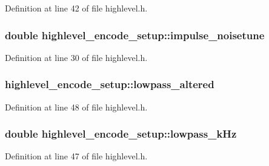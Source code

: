 Definition at line 42 of file highlevel.\+h.

\subsubsection[{\texorpdfstring{impulse\+\_\+noisetune}{impulse_noisetune}}]{\setlength{\rightskip}{0pt plus 5cm}double highlevel\+\_\+encode\+\_\+setup\+::impulse\+\_\+noisetune}\hypertarget{structhighlevel__encode__setup_adc48ac43bf3f4c896d60e7cac2710b19}{}\label{structhighlevel__encode__setup_adc48ac43bf3f4c896d60e7cac2710b19}


Definition at line 30 of file highlevel.\+h.

\subsubsection[{\texorpdfstring{lowpass\+\_\+altered}{lowpass_altered}}]{ highlevel\+\_\+encode\+\_\+setup\+::lowpass\+\_\+altered}\hypertarget{structhighlevel__encode__setup_af62698a474d022bcdb6c04814e84f2ae}{}\label{structhighlevel__encode__setup_af62698a474d022bcdb6c04814e84f2ae}


Definition at line 48 of file highlevel.\+h.

\subsubsection[{\texorpdfstring{lowpass\+\_\+k\+Hz}{lowpass_kHz}}]{\setlength{\rightskip}{0pt plus 5cm}double highlevel\+\_\+encode\+\_\+setup\+::lowpass\+\_\+k\+Hz}\hypertarget{structhighlevel__encode__setup_ada5a59b19ecd30dfa5d876eb66c8e0ce}{}\label{structhighlevel__encode__setup_ada5a59b19ecd30dfa5d876eb66c8e0ce}


Definition at line 47 of file highlevel.\+h.

